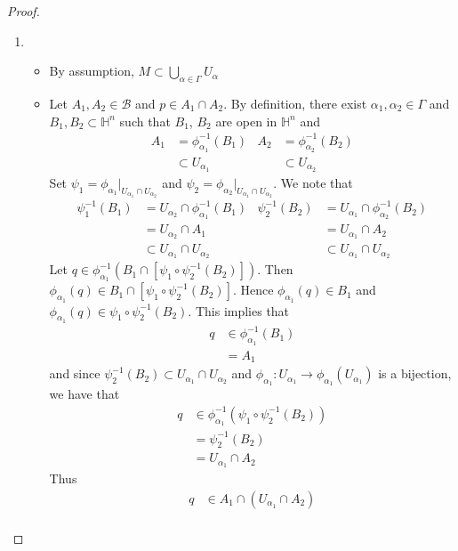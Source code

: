 \documentclass{book}
\theoremstyle{definition}
\newcommand{\al}{\alpha}
\newcommand{\Gam}{\Gamma}
\renewcommand{\H}{\mathbb{H}}
\newcommand{\MB}{\mathcal{B}}
\DeclareMathOperator*{\0}{\mbf{0}}
\DeclareMathOperator*{\1}{\mbf{1}}
\begin{document}
	\begin{proof} \
		\begin{enumerate}
			\item \begin{itemize}
				\item By assumption, $M \subset \bigcup\limits_{\al \in \Gam} U_{\al}$
				\item Let $A_1, A_2 \in \MB$ and $p \in A_1 \cap A_2$. By definition, there exist $\al_1, \al_2 \in \Gam$ and $B_1, B_2 \subset \H^n$ such that $B_1$, $B_2$ are open in $\H^n$ and 
				\begin{align*}
					A_1 & = \phi_{\al_1}^{-1}(B_1)  & A_2 & = \phi_{\al_2}^{-1}(B_2) \\
					& \subset U_{\al_1}         &     & \subset U_{\al_2}
				\end{align*}
				Set $\psi_1 = \phi_{\al_1}|_{U_{\al_1} \cap U_{\al_2}}$ and $\psi_2 = \phi_{\al_2}|_{U_{\al_1} \cap U_{\al_2}}$. We note that  
				\begin{align*}
					\psi_1^{-1}(B_1) & = U_{\al_2} \cap \phi_{\al_1}^{-1}(B_1) &  \psi_2^{-1}(B_2) & = U_{\al_1} \cap \phi_{\al_2}^{-1}(B_2) \\
					& = U_{\al_2} \cap A_1                    &                   & = U_{\al_1} \cap A_2 \\
					& \subset U_{\al_1} \cap U_{\al_2}        &                   & \subset U_{\al_1} \cap U_{\al_2}
				\end{align*}
				Let $q \in \phi_{\al_1}^{-1}(B_1 \cap [\psi_1 \circ \psi_2^{-1}(B_2)])$. Then $\phi_{\al_1}(q) \in B_1 \cap [\psi_1 \circ \psi_2^{-1}(B_2)]$. Hence $\phi_{\al_1}(q) \in B_1$ and $\phi_{\al_1}(q) \in \psi_1 \circ \psi_2^{-1}(B_2)$. This implies that  
				\begin{align*}
					q 
					& \in \phi_{\al_1}^{-1}(B_1) \\
					& = A_1
				\end{align*}
				and since $\psi_2^{-1}(B_2) \subset U_{\al_1} \cap U_{\al_2}$ and $\phi_{\al_1}: U_{\al_1} \rightarrow \phi_{\al_1}(U_{\al_1})$ is a bijection, we have that
				\begin{align*}
					q 
					& \in \phi_{\al_1}^{-1}(\psi_1 \circ \psi_2^{-1}(B_2)) \\
					& = \psi_2^{-1}(B_2) \\
					& = U_{\al_1} \cap A_2 
				\end{align*} 
				Thus 
				\begin{align*}
					q 
					& \in A_1 \cap (U_{\al_1} \cap A_2) \\

\end{align*}
\end{itemize}
\end{enumerate}
\end{proof}
\end{document}
